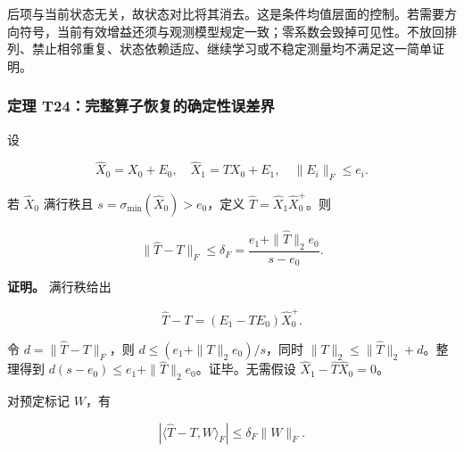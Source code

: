 \documentclass[11pt,a4paper]{article}
\begin{document}
后项与当前状态无关，故状态对比将其消去。这是条件均值层面的控制。若需要方向符号，当前有效增益还须与观测模型规定一致；零系数会毁掉可见性。不放回排列、禁止相邻重复、状态依赖适应、继续学习或不稳定测量均不满足这一简单证明。

\subsubsection{定理
T24：完整算子恢复的确定性误差界}\label{ux5b9aux7406-t24ux5b8cux6574ux7b97ux5b50ux6062ux590dux7684ux786eux5b9aux6027ux8befux5deeux754c}

\par
\noindent\begin{minipage}{\linewidth}

设

\[
\widehat X_0=X_0+E_0,\quad
\widehat X_1=TX_0+E_1,\quad
\|E_i\|_F\le e_i.
\]

\end{minipage}\par

\par
\noindent\begin{minipage}{\linewidth}

若 \(\widehat X_0\) 满行秩且 \(s=\sigma_{\min}(\widehat X_0)>e_0\)，定义
\(\widehat T=\widehat X_1\widehat X_0^+\)。则

\[
\|\widehat T-T\|_F\le
\delta_F=\frac{e_1+\|\widehat T\|_2e_0}{s-e_0}.
\]

\end{minipage}\par

\par
\noindent\begin{minipage}{\linewidth}

\textbf{证明。} 满行秩给出

\[
\widehat T-T=(E_1-TE_0)\widehat X_0^+.
\]

\end{minipage}\par

令 \(d=\|\widehat T-T\|_F\)，则 \(d\le(e_1+\|T\|_2e_0)/s\)，同时
\(\|T\|_2\le\|\widehat T\|_2+d\)。整理得到
\(d(s-e_0)\le e_1+\|\widehat T\|_2e_0\)。证毕。无需假设
\(\widehat X_1-\widehat T\widehat X_0=0\)。

\par
\noindent\begin{minipage}{\linewidth}

对预定标记 \(W\)，有

\[
|\langle\widehat T-T,W\rangle_F|\le\delta_F\|W\|_F.
\]

\end{minipage}\par
\end{document}
